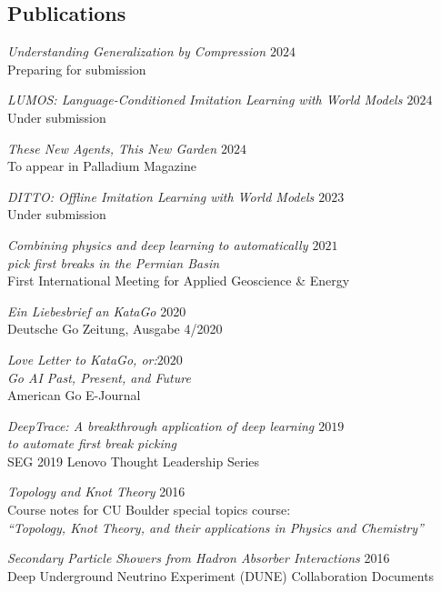 \documentclass[margin]{res}
\begin{document}
\begin{resume}
                 \section{Publications}

                 {\sl Understanding Generalization by Compression \hfill $2024$}\\
                 Preparing for submission

                 {\sl LUMOS: Language-Conditioned Imitation Learning with World Models \hfill $2024$}\\
                 Under submission

                 {\sl These New Agents, This New Garden \hfill            $2024$}\\
		         To appear in Palladium Magazine

                 {\sl DITTO: Offline Imitation Learning with World Models \hfill            $2023$}\\
		         Under submission

                 {\sl Combining physics and deep learning to automatically \hfill            $2021$ \\ pick first breaks in the Permian Basin} \\
		First International Meeting for Applied Geoscience \& Energy

                {\sl Ein Liebesbrief an KataGo} \hfill 2020 \\
                Deutsche Go Zeitung, Ausgabe 4/2020

                {\sl Love Letter to KataGo, or:\hfill $2020$\\ Go AI Past, Present, and Future} \\
                American Go E-Journal

                {\sl DeepTrace: A breakthrough application of deep learning \hfill $2019$\\ to automate first break picking}  \\
                SEG 2019 Lenovo Thought Leadership Series

                {\sl Topology and Knot Theory} \hfill 2016 \\
                Course notes for CU Boulder special topics course: \\
                \textit{``Topology, Knot Theory, and their applications in Physics and Chemistry''}

                {\sl Secondary Particle Showers from Hadron Absorber Interactions} \hfill 2016 \\
                Deep Underground Neutrino Experiment (DUNE) Collaboration Documents



\end{resume}
\end{document}
